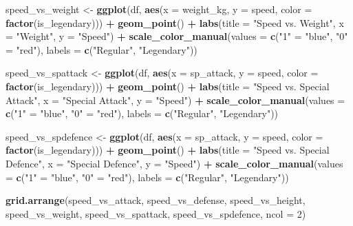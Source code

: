 \documentclass[
]{article}
\newenvironment{Shaded}{\begin{snugshade}}{\end{snugshade}}
\newcommand{\AttributeTok}[1]{\textcolor[rgb]{0.13,0.29,0.53}{#1}}
\newcommand{\DecValTok}[1]{\textcolor[rgb]{0.00,0.00,0.81}{#1}}
\newcommand{\FunctionTok}[1]{\textcolor[rgb]{0.13,0.29,0.53}{\textbf{#1}}}
\newcommand{\NormalTok}[1]{#1}
\newcommand{\OtherTok}[1]{\textcolor[rgb]{0.56,0.35,0.01}{#1}}
\newcommand{\SpecialCharTok}[1]{\textcolor[rgb]{0.81,0.36,0.00}{\textbf{#1}}}
\newcommand{\StringTok}[1]{\textcolor[rgb]{0.31,0.60,0.02}{#1}}
\begin{document}
\begin{Shaded}
\begin{Highlighting}[]
\NormalTok{speed\_vs\_weight }\OtherTok{\textless{}{-}} \FunctionTok{ggplot}\NormalTok{(df, }\FunctionTok{aes}\NormalTok{(}\AttributeTok{x =}\NormalTok{ weight\_kg, }\AttributeTok{y =}\NormalTok{ speed, }\AttributeTok{color =} \FunctionTok{factor}\NormalTok{(is\_legendary))) }\SpecialCharTok{+}
  \FunctionTok{geom\_point}\NormalTok{() }\SpecialCharTok{+}
  \FunctionTok{labs}\NormalTok{(}\AttributeTok{title =} \StringTok{"Speed vs. Weight"}\NormalTok{, }\AttributeTok{x =} \StringTok{"Weight"}\NormalTok{, }\AttributeTok{y =} \StringTok{"Speed"}\NormalTok{) }\SpecialCharTok{+}
  \FunctionTok{scale\_color\_manual}\NormalTok{(}\AttributeTok{values =} \FunctionTok{c}\NormalTok{(}\StringTok{"1"} \OtherTok{=} \StringTok{"blue"}\NormalTok{, }\StringTok{"0"} \OtherTok{=} \StringTok{"red"}\NormalTok{), }\AttributeTok{labels =} \FunctionTok{c}\NormalTok{(}\StringTok{"Regular"}\NormalTok{, }\StringTok{"Legendary"}\NormalTok{))}

\NormalTok{speed\_vs\_spattack }\OtherTok{\textless{}{-}} \FunctionTok{ggplot}\NormalTok{(df, }\FunctionTok{aes}\NormalTok{(}\AttributeTok{x =}\NormalTok{ sp\_attack, }\AttributeTok{y =}\NormalTok{ speed, }\AttributeTok{color =} \FunctionTok{factor}\NormalTok{(is\_legendary))) }\SpecialCharTok{+}
  \FunctionTok{geom\_point}\NormalTok{() }\SpecialCharTok{+}
  \FunctionTok{labs}\NormalTok{(}\AttributeTok{title =} \StringTok{"Speed vs. Special Attack"}\NormalTok{, }\AttributeTok{x =} \StringTok{"Special Attack"}\NormalTok{, }\AttributeTok{y =} \StringTok{"Speed"}\NormalTok{) }\SpecialCharTok{+}
  \FunctionTok{scale\_color\_manual}\NormalTok{(}\AttributeTok{values =} \FunctionTok{c}\NormalTok{(}\StringTok{"1"} \OtherTok{=} \StringTok{"blue"}\NormalTok{, }\StringTok{"0"} \OtherTok{=} \StringTok{"red"}\NormalTok{), }\AttributeTok{labels =} \FunctionTok{c}\NormalTok{(}\StringTok{"Regular"}\NormalTok{, }\StringTok{"Legendary"}\NormalTok{))}

\NormalTok{speed\_vs\_spdefence }\OtherTok{\textless{}{-}} \FunctionTok{ggplot}\NormalTok{(df, }\FunctionTok{aes}\NormalTok{(}\AttributeTok{x =}\NormalTok{ sp\_attack, }\AttributeTok{y =}\NormalTok{ speed, }\AttributeTok{color =} \FunctionTok{factor}\NormalTok{(is\_legendary))) }\SpecialCharTok{+}
  \FunctionTok{geom\_point}\NormalTok{() }\SpecialCharTok{+}
  \FunctionTok{labs}\NormalTok{(}\AttributeTok{title =} \StringTok{"Speed vs. Special Defence"}\NormalTok{, }\AttributeTok{x =} \StringTok{"Special Defence"}\NormalTok{, }\AttributeTok{y =} \StringTok{"Speed"}\NormalTok{) }\SpecialCharTok{+}
  \FunctionTok{scale\_color\_manual}\NormalTok{(}\AttributeTok{values =} \FunctionTok{c}\NormalTok{(}\StringTok{"1"} \OtherTok{=} \StringTok{"blue"}\NormalTok{, }\StringTok{"0"} \OtherTok{=} \StringTok{"red"}\NormalTok{), }\AttributeTok{labels =} \FunctionTok{c}\NormalTok{(}\StringTok{"Regular"}\NormalTok{, }\StringTok{"Legendary"}\NormalTok{))}

\FunctionTok{grid.arrange}\NormalTok{(speed\_vs\_attack, speed\_vs\_defense, speed\_vs\_height, speed\_vs\_weight, speed\_vs\_spattack, speed\_vs\_spdefence, }\AttributeTok{ncol =} \DecValTok{2}\NormalTok{)}
\end{Highlighting}
\end{Shaded}
\end{document}
